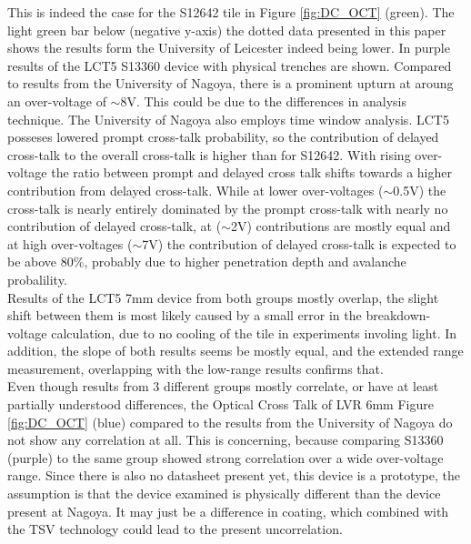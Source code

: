 \documentclass[12pt,article,type=msc,colorback,accentcolor=tud9c]{tudthesis}
\begin{document}
This is indeed the case for the S12642 tile in Figure \ref{fig:DC_OCT} (green). The light green bar below (negative y-axis) the dotted data presented in this paper shows the results form the University of Leicester indeed being lower. In purple results of the LCT5 S13360 device with physical trenches are shown. Compared to results from the University of Nagoya, there is a prominent upturn at aroung an over-voltage of $\sim$8V. This could be due to the differences in analysis technique. The University of Nagoya also employs time window analysis. LCT5 posseses lowered prompt cross-talk probability, so the contribution of delayed cross-talk to the overall cross-talk is higher than for S12642. With rising over-voltage the ratio between prompt and delayed cross talk shifts towards a higher contribution from delayed cross-talk\cite{DelayedOCT}\cite{Yamamoto}. While at lower over-voltages ($\sim$0.5V) the cross-talk is nearly entirely dominated by the prompt cross-talk with nearly no contribution of delayed cross-talk, at ($\sim$2V) contributions are mostly equal and at high over-voltages ($\sim$7V) the contribution of delayed cross-talk is expected to be above 80\%, probably due to higher penetration depth and avalanche probalility.\\
Results of the LCT5 7mm device from both groups mostly overlap, the slight shift between them is most likely caused by a small error in the breakdown-voltage calculation, due to no cooling of the tile in experiments involing light. In addition, the slope of both results seems be mostly equal, and the extended range measurement, overlapping with the low-range results confirms that.\\
Even though results from 3 different groups mostly correlate, or have at least partially understood differences, the Optical Cross Talk of LVR 6mm Figure \ref{fig:DC_OCT} (blue) compared to the results from the University of Nagoya do not show any correlation at all. This is concerning, because comparing S13360 (purple) to the same group showed strong correlation over a wide over-voltage range. Since there is also no datasheet present yet, this device is a prototype, the assumption is that the device examined is physically different than the device present at Nagoya. It may just be a difference in coating, which combined with the TSV technology could lead to the present uncorrelation\cite{Yamamoto}.
\end{document}

